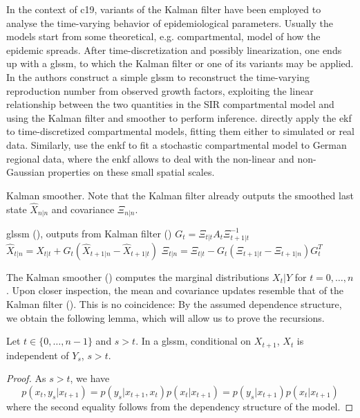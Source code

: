 In the context of \acrshort{c19}, variants of the Kalman filter have been employed to analyse the time-varying behavior of epidemiological parameters. Usually the models start from some theoretical, e.g. compartmental, model of how the epidemic spreads. After time-discretization and possibly linearization, one ends up with a \acrshort{glssm}, to which the Kalman filter or one of its variants may be applied. 
In \citep{Arroyo-Marioli2021Tracking} the authors construct a simple \acrshort{glssm} to reconstruct the time-varying reproduction number from observed growth factors, exploiting the linear relationship between the two quantities in the SIR compartmental model and using the Kalman filter and smoother to perform inference. 
\citep{Zhu2021Extended,Song2021Maximum} directly apply the \acrshort{ekf} to time-discretized compartmental models, fitting them either to simulated \citep{Zhu2021Extended} or real \citep{Song2021Maximum} data. Similarly, \citep{Engbert2020Sequential} use the \acrshort{enkf} to fit a stochastic compartmental model to German regional data, where the \acrshort{enkf} allows to deal with the non-linear and non-Gaussian properties on these small spatial scales.

\begin{algorithm}
    \caption{Kalman smoother. Note that the Kalman filter already outputs the smoothed last state $\hat X_{n|n}$ and covariance $\Xi_{n|n}$.}
    \label{alg:kalman_smoother}
    \begin{algorithmic}
        \Require \acrshort{glssm} (), outputs from Kalman filter ()
            \State $G_{t} = \Xi_{t|t} A_{t}\Xi_{t+1|t}^{-1}$
            \State $\hat X_{t | n} = \hat X_{t|t} + G_{t} \left( \hat X_{t + 1|n} - \hat X_{t + 1|t} \right)$
            \State $\Xi_{t|n} = \Xi_{t|t} - G_{t} \left( \Xi_{t + 1|t} - \Xi_{t + 1|n} \right)G_{t}^T$
        \EndFor
    \end{algorithmic}
\end{algorithm}

The Kalman smoother () computes the marginal distributions $X_{t} | Y$ for $t = 0, \dots, n$. Upon closer inspection, the mean and covariance updates resemble that of the Kalman filter (). This is no coincidence: By the assumed dependence structure, we obtain the following lemma, which will allow us to prove the recursions.
\begin{lemma}
    Let $t \in \{0, \dots, n - 1\}$ and $s > t$. In a \acrshort{glssm}, conditional on $X_{t + 1}$, $X_{t}$ is independent of $Y_{s}$, $s > t$. 
\end{lemma}
\begin{proof}
    As $s > t$, we have
    $$
    p(x_{t}, y_{s} | x_{t + 1}) = p(y_{s}| x_{t + 1}, x_{t}) p(x_{t} | x_{t + 1}) = p(y_{s} | x_{t + 1}) p(x_{t} | x_{t + 1})
    $$
    where the second equality follows from the dependency structure of the model. 
\end{proof}

